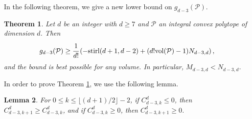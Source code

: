\documentclass[12pt]{amsart}
\newtheorem{theorem}{Theorem}[section]
\newtheorem{lemma}[theorem]{Lemma}
\theoremstyle{definition}
\theoremstyle{remark}
\numberwithin{equation}{section}
\def\Pc{{\mathcal P}}
\begin{document}
In the following theorem, we give a new lower bound on $g_{d-3}(\Pc)$.

\begin{theorem}
	\label{d-3}
	Let $d$ be an integer with $d \geq 7$ and $\Pc$ an integral convex polytope of dimension $d$.
	Then
	$$g_{d-3}(\Pc) \geq \cfrac{1}{d!}\left(-\textnormal{stirl}(d+1,d-2)+(d!\textnormal{vol}(\Pc)-1)N_{d-3,d}\right),$$
	and the bound is best possible for any volume.
	In particular, $M_{d-3,d}<N_{d-3,d}$.
\end{theorem}
In order to prove Theorem \ref{d-3}, we use the following lemma.
\begin{lemma}
	\label{kak}
	For $0 \leq k \leq \lfloor(d+1)/2\rfloor-2$,
	if $C_{d-3,k}^d\leq 0$, then $C_{d-3,k+1}^d \geq C_{d-3,k}^d$,
	and if $C_{d-3,k}^d\geq 0$, then $C_{d-3,k+1}^d \geq 0$.
\end{lemma}
\end{document}
